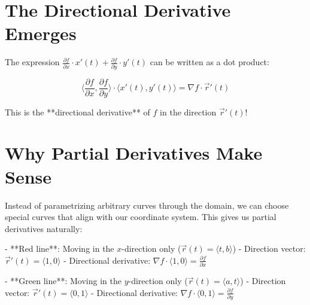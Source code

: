 \documentclass{ximera}
\begin{document}
\section{The Directional Derivative Emerges}

The expression $\frac{\partial f}{\partial x} \cdot x'(t) + \frac{\partial f}{\partial y} \cdot y'(t)$ can be written as a dot product:

$$\langle \frac{\partial f}{\partial x}, \frac{\partial f}{\partial y} \rangle \cdot \langle x'(t), y'(t) \rangle = \nabla f \cdot \vec{r}'(t)$$

This is the **directional derivative** of $f$ in the direction $\vec{r}'(t)$!

\section{Why Partial Derivatives Make Sense}

Instead of parametrizing arbitrary curves through the domain, we can choose special curves that align with our coordinate system. This gives us partial derivatives naturally:


- **Red line**: Moving in the $x$-direction only ($\vec{r}(t) = \langle t, b \rangle$)
  - Direction vector: $\vec{r}'(t) = \langle 1, 0 \rangle$
  - Directional derivative: $\nabla f \cdot \langle 1, 0 \rangle = \frac{\partial f}{\partial x}$

- **Green line**: Moving in the $y$-direction only ($\vec{r}(t) = \langle a, t \rangle$)
  - Direction vector: $\vec{r}'(t) = \langle 0, 1 \rangle$  
  - Directional derivative: $\nabla f \cdot \langle 0, 1 \rangle = \frac{\partial f}{\partial y}$
\end{document}

